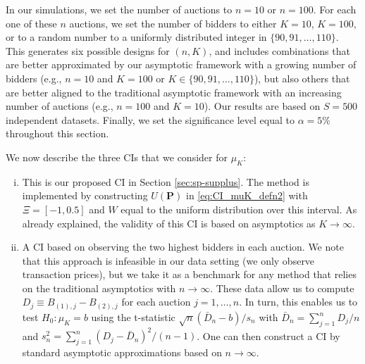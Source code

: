 In our simulations, we set the number of auctions to $n=10$ or $n=100$. For each one of these $n$ auctions, we set the number of bidders to either $K=10$, $K=100$, or to a random number to a uniformly distributed integer in $\{90,91,\dots,110\}$. This generates six possible designs for $(n,K)$, and includes combinations that are better approximated by our asymptotic framework with a growing number of bidders (e.g., $n=10$ and $K=100$ or $K \in\{90,91,\dots,110\}$), but also others that are better aligned to the traditional asymptotic framework with an increasing number of auctions (e.g., $n=100$ and $K=10$). Our results are based on $S=500$ independent datasets. Finally, we set the significance level equal to $\alpha =5\%$ throughout this section.

We now describe the three CIs that we consider for $\mu _{K}$:
\begin{enumerate}[(i)]
    \item This is our proposed CI in Section \ref{sec:sp-supplus}. The method is implemented by constructing $U( \mathbf{P})$ in \eqref{eq:CI_muK_defn2} with $\Xi =[ -1,0.5] $ and $W$ equal to the uniform distribution over this interval. As already explained, the validity of this CI is based on asymptotics as $K\to\infty$.
    \item A CI based on observing the two highest bidders in each auction. We note that this approach is infeasible in our data setting (we only observe transaction prices), but we take it as a benchmark for any method that relies on the traditional asymptotics with $n\to \infty$. 
    These data allow us to compute $D_{j}\equiv B_{(1),j}-B_{(2),j}$ for each auction $j=1,\dots,n$. In turn, this enables us to test $H_0:\mu_{K} = b$ using the t-statistic $\sqrt{n}(\bar{D}_{n} - b)/s_n$ with $\bar{D}_{n}=\sum_{j=1}^n D_{j}/n$ and $s_n^2 = {\sum^{n}_{j=1} ( D_{j}-\bar{D}_{n}) ^{2}/(n-1)}$. One can then construct a CI by standard asymptotic approximations based on $n\to\infty$. 

\end{enumerate}
